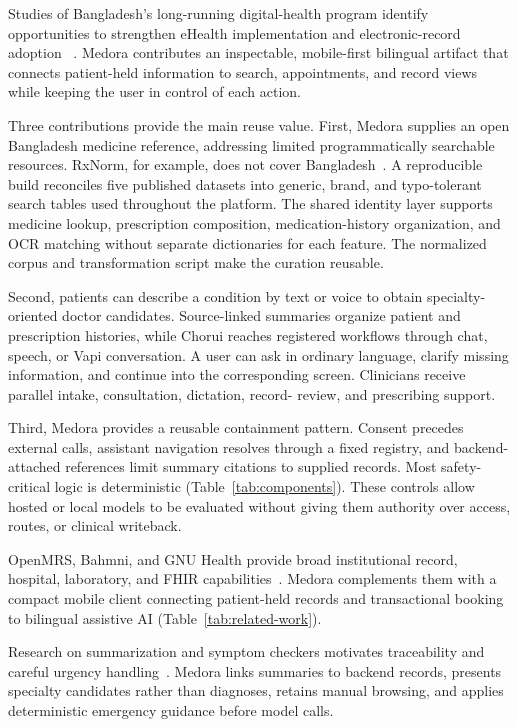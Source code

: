 \documentclass[preprint,12pt,a4paper]{elsarticle}
\begin{document}
Studies of Bangladesh's long-running digital-health program identify opportunities to
strengthen eHealth implementation and electronic-record adoption
~\cite{ahmed2014,khan2012}. Medora contributes an inspectable, mobile-first bilingual
artifact that connects patient-held information to search, appointments, and record views
while keeping the user in control of each action.

Three contributions provide the main reuse value. First, Medora supplies an open Bangladesh
medicine reference, addressing limited programmatically searchable resources. RxNorm, for
example, does not cover Bangladesh~\cite{rxnorm}. A reproducible build reconciles five
published datasets into generic, brand, and typo-tolerant search tables used throughout the
platform. The shared identity layer supports medicine lookup, prescription composition,
medication-history organization, and OCR matching without separate dictionaries for each
feature. The normalized corpus and transformation script make the curation reusable.


Second, patients can describe a condition by text or voice to obtain specialty-oriented
doctor candidates. Source-linked summaries organize patient and prescription histories,
while Chorui reaches registered workflows through chat, speech, or Vapi conversation. A
user can ask in ordinary language, clarify missing information, and continue into the
corresponding screen. Clinicians receive parallel intake, consultation, dictation, record-
review, and prescribing support.

Third, Medora provides a reusable containment pattern. Consent precedes external calls,
assistant navigation resolves through a fixed registry, and backend-attached references
limit summary citations to supplied records. Most safety-critical logic is deterministic
(Table~\ref{tab:components}). These controls allow hosted or local models to be evaluated
without giving them authority over access, routes, or clinical writeback.


OpenMRS, Bahmni, and GNU Health provide broad institutional record, hospital, laboratory,
and FHIR capabilities~\cite{openmrs,bahmni,gnuhealth}. Medora complements them with a
compact mobile client connecting patient-held records and transactional booking to
bilingual assistive AI (Table~\ref{tab:related-work}).

Research on summarization and symptom checkers motivates traceability and careful urgency
handling~\cite{shing2021,tracsum,wallace2022}. Medora links summaries to backend records,
presents specialty candidates rather than diagnoses, retains manual browsing, and applies
deterministic emergency guidance before model calls.
\end{document}
